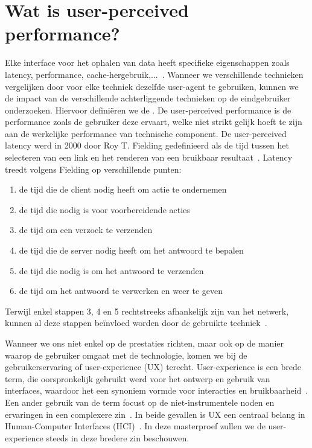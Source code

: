 \section{Wat is user-perceived performance?}
\label{sec:what_is_user_perceived_performance}
Elke interface voor het ophalen van data heeft specifieke eigenschappen zoals latency, performance, cache-hergebruik,...~\citep{verborgh16}. Wanneer we verschillende technieken vergelijken door voor elke techniek dezelfde user-agent te gebruiken, kunnen we de impact van de verschillende achterliggende technieken op de eindgebruiker onderzoeken. Hiervoor definiëren we de . De user-perceived performance is de performance zoals de gebruiker deze ervaart, welke niet strikt gelijk hoeft te zijn aan de werkelijke performance van technische component. De user-perceived latency werd in 2000 door Roy T. Fielding gedefinieerd als de tijd tussen het selecteren van een link en het renderen van een bruikbaar resultaat~\citep{fielding99}. Latency treedt volgens Fielding op verschillende punten: 
\begin{enumerate}
	\item de tijd die de client nodig heeft om actie te ondernemen 
	\item de tijd die nodig is voor voorbereidende acties
	\item de tijd om een verzoek te verzenden
	\item de tijd die de server nodig heeft om het antwoord te bepalen
	\item de tijd die nodig is om het antwoord te verzenden
	\item de tijd om het antwoord te verwerken en weer te geven
\end{enumerate}
Terwijl enkel stappen 3, 4 en 5 rechtstreeks afhankelijk zijn van het netwerk, kunnen al deze stappen beïnvloed worden door de gebruikte techniek~\citep{fielding99}.

Wanneer we ons niet enkel op de prestaties richten, maar ook op de manier waarop de gebruiker omgaat met de technologie, komen we bij de gebruikerservaring of user-experience (UX) terecht. User-experience is een brede term, die oorspronkelijk gebruikt werd voor het ontwerp en gebruik van interfaces, waardoor het een synoniem vormde voor interacties en bruikbaarheid~\citep{avila11}. Een ander gebruik van de term focust op de niet-instrumentele noden en ervaringen in een complexere zin~\citep{avila11}. In beide gevallen is UX een centraal belang in Human-Computer Interfaces (HCI)~\citep{NíChonchúir2008}. In deze masterproef zullen we de user-experience steeds in deze bredere zin beschouwen. 

